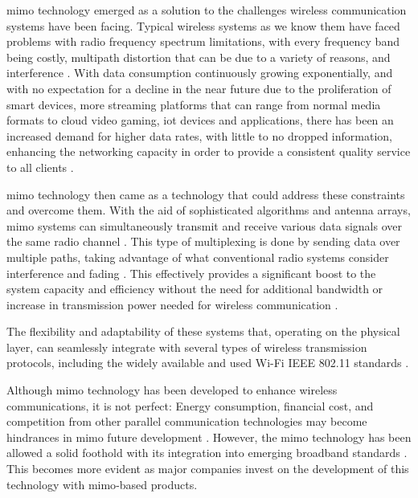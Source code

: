 \par \ac{mimo} technology emerged as a solution to the challenges wireless communication systems have been facing\cite{Spencer2004AnDownlink}. Typical wireless systems as we know them have faced problems with radio frequency spectrum limitations, with every frequency band being costly, multipath distortion that can be due to a variety of reasons, and interference \cite{Spencer2004AnDownlink}\cite{Lawton2008IsCommunications}. With data consumption continuously growing exponentially, and with no expectation for a decline in the near future due to the proliferation of smart devices, more streaming platforms that can range from normal media formats to cloud video gaming, \ac{iot} devices and applications, there has been an increased demand for higher data rates, with little to no dropped information, enhancing the networking capacity in order to provide a consistent quality service to all clients \cite{Spencer2004AnDownlink}.

\par \ac{mimo} technology then came as a technology that could address these constraints and overcome them. With the aid of sophisticated algorithms and antenna arrays, \ac{mimo} systems can simultaneously transmit and receive various data signals over the same radio channel \cite{Alexandropoulos2022Full-DuplexDirections}\cite{Zhang2006FutureNetworks}. This type of multiplexing is done by sending data over multiple paths, taking advantage of what conventional radio systems consider interference and fading \cite{Spencer2004AnDownlink}\cite{Alexandropoulos2022Full-DuplexDirections}. This effectively provides a significant boost to the system capacity and efficiency without the need for additional bandwidth or increase in transmission power needed for wireless communication \cite{Lawton2008IsCommunications}.

\par The flexibility and adaptability of these systems that, operating on the physical layer, can seamlessly integrate with several types of wireless transmission protocols, including the widely available and used Wi-Fi IEEE 802.11 standards \cite{Spencer2004AnDownlink}\cite{Lawton2008IsCommunications}.

\par Although \ac{mimo} technology has been developed to enhance wireless communications, it is not perfect: Energy consumption, financial cost, and competition from other parallel communication technologies may become hindrances in \ac{mimo} future development \cite{Rusek2013ScalingArrays}. However, the \ac{mimo} technology has been allowed a solid foothold with its integration into emerging broadband standards \cite{Zhang2006FutureNetworks}. This becomes more evident as major companies invest on the development of this technology with \ac{mimo}-based products.

